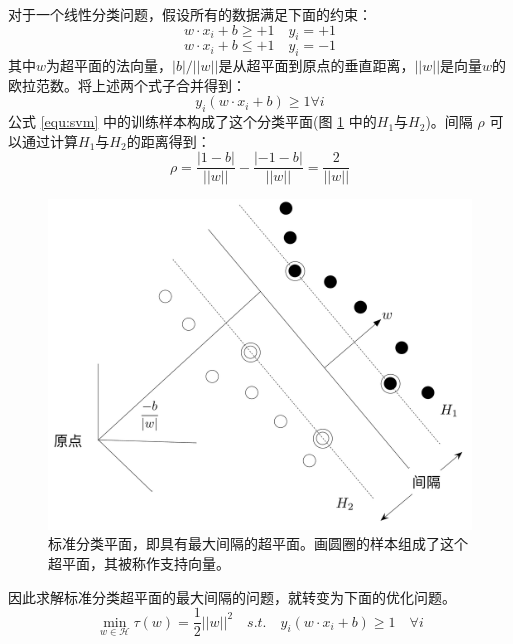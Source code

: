 对于一个线性分类问题，假设所有的数据满足下面的约束：
\begin{equation}
	w\cdot x_i +b \geq + 1 \quad y_i = +1
	\label{equ:constraint1}
\end{equation}
\begin{equation}
	w\cdot x_i +b \leq + 1 \quad y_i = -1
	\label{equ:constraint2}	
\end{equation}
其中$w$为超平面的法向量，$|b|/||w||$是从超平面到原点的垂直距离，$||w||$是向量$w$的欧拉范数。将上述两个式子合并得到：
\begin{equation}
	y_i(w\cdot x_i+b)\geq 1 \forall i
	\label{equ:svm}
\end{equation}
公式 \ref{equ:svm} 中的训练样本构成了这个分类平面(图 \ref{fig:hyperplanes} 中的$H_1$与$H_2$)。间隔 $\rho$ 可以通过计算$H_1$与$H_2$的距离得到：
\begin{equation}
	\rho=\frac{|1-b|}{||w||}-\frac{|-1-b|}{||w||}=\frac{2}{||w||}
\end{equation}
\begin{figure}[H]
	\centering
	\includegraphics[width=\textwidth]{figures/emitter/svm_hard}
	\caption{标准分类平面，即具有最大间隔的超平面。画圆圈的样本组成了这个超平面，其被称作支持向量。}
	\label{fig:hyperplanes}
\end{figure}
因此求解标准分类超平面的最大间隔的问题，就转变为下面的优化问题。
\begin{equation}
	\min \limits_{w\in \mathcal{H}} \tau(w)=\frac{1}{2}||w||^2\quad s.t. \quad y_i(w\cdot x_i +b) \geq 1 \quad \forall i
	\label{equ:optimization}
\end{equation}


